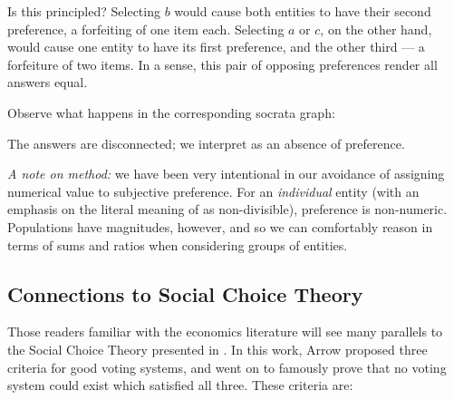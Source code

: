 Is this principled?
Selecting $b$ would cause both entities to have their second preference, a forfeiting of one item each.
Selecting $a$ or $c$, on the other hand, would cause one entity to have its first preference, and the other third --- a forfeiture of two items.
In a sense, this pair of opposing preferences render all answers equal.

Observe what happens in the corresponding socrata graph:

\begin{center}
\end{center}

\begin{center}
\end{center}

The answers are disconnected; we interpret as an absence of preference.

\bigskip

\textit{A note on method:} we have been very intentional in our avoidance of assigning numerical value to subjective preference.
For an \textit{individual} entity (with an emphasis on the literal meaning of  as non-divisible), preference is non-numeric.
Populations have magnitudes, however, and so we can comfortably reason in terms of sums and ratios when considering groups of entities.

\subsection{Connections to Social Choice Theory}

Those readers familiar with the economics literature will see many parallels to the Social Choice Theory presented in \cite{arrow}.
In this work, Arrow proposed three criteria for good voting systems, and went on to famously prove that no voting system could exist which satisfied all three.
These criteria are:


